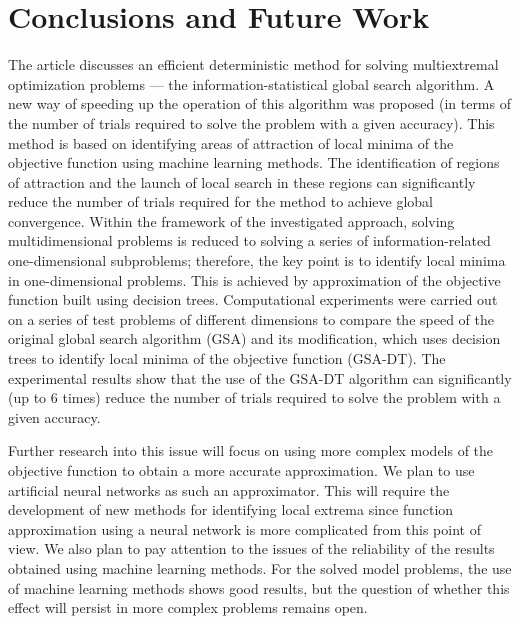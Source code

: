 \documentclass[entropy,article,submit,moreauthors,pdftex]{Definitions/mdpi}
\begin{document}
\section{Conclusions and Future Work}

The article discusses an efficient deterministic method for solving multiextremal optimization problems --- the information-statistical global search algorithm.
A new way of speeding up the operation of this algorithm was proposed (in terms of the number of trials required to solve the problem with a given accuracy). This method is based on identifying areas of attraction of local minima of the objective function using machine learning methods. The identification of regions of attraction and the launch of local search in these regions can significantly reduce the number of trials required for the method to achieve global convergence. 
Within the framework of the investigated approach, solving multidimensional problems is reduced to solving a series of information-related one-dimensional subproblems; therefore, the key point is to identify local minima in one-dimensional problems. This is achieved by approximation of the objective function built using decision trees. 
Computational experiments were carried out on a series of test problems of different dimensions to compare the speed of the original global search algorithm (GSA) and its modification, which uses decision trees to identify local minima of the objective function (GSA-DT). 
The experimental results show that the use of the GSA-DT algorithm can significantly (up to 6 times) reduce the number of trials required to solve the problem with a given accuracy.

Further research into this issue will focus on using more complex models of the objective function to obtain a more accurate approximation. We plan to use artificial neural networks as such an approximator. This will require the development of new methods for identifying local extrema since function approximation using a neural network is more complicated from this point of view. We also plan to pay attention to the issues of the reliability of the results obtained using machine learning methods. For the solved model problems, the use of machine learning methods shows good results, but the question of whether this effect will persist in more complex problems remains open.
\end{document}
